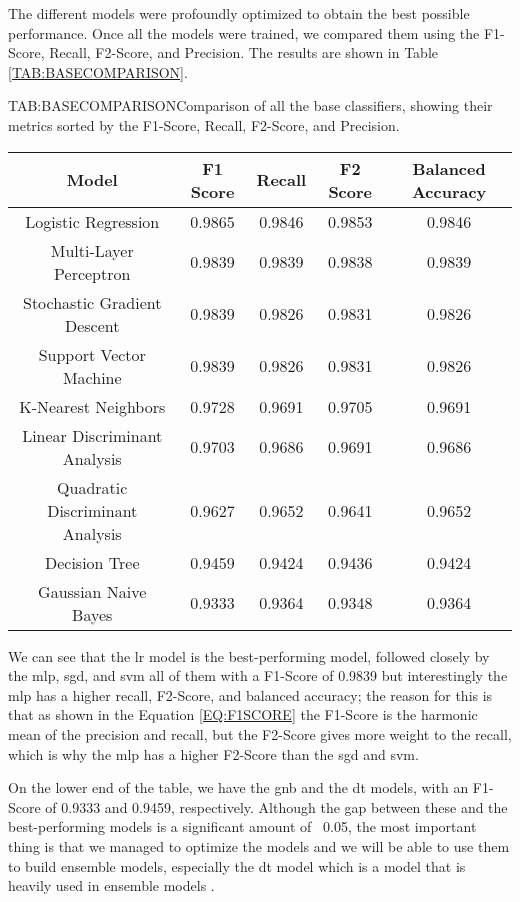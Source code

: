 The different models were profoundly optimized to obtain the best possible performance. Once all the models were trained, we compared them using the F1-Score, Recall, F2-Score, and Precision. The results are shown in Table \ref{TAB:BASECOMPARISON}.

\begin{table}[Base Classifiers Comparison]{TAB:BASECOMPARISON}{Comparison of all the base classifiers, showing their metrics sorted by the F1-Score, Recall, F2-Score, and Precision.}
    \begin{tabular}{|c|c|c|c|c|}
        \hline
        \textbf{Model} & \textbf{F1 Score} & \textbf{Recall} & \textbf{F2 Score} & \textbf{Balanced Accuracy} \\
        \hline
        Logistic Regression           & 0.9865 & 0.9846 & 0.9853 & 0.9846 \\
        Multi-Layer Perceptron        & 0.9839 & 0.9839 & 0.9838 & 0.9839 \\
        Stochastic Gradient Descent   & 0.9839 & 0.9826 & 0.9831 & 0.9826 \\
        Support Vector Machine        & 0.9839 & 0.9826 & 0.9831 & 0.9826 \\
        K-Nearest Neighbors           & 0.9728 & 0.9691 & 0.9705 & 0.9691 \\
        Linear Discriminant Analysis  & 0.9703 & 0.9686 & 0.9691 & 0.9686 \\
        Quadratic Discriminant Analysis & 0.9627 & 0.9652 & 0.9641 & 0.9652 \\
        Decision Tree                 & 0.9459 & 0.9424 & 0.9436 & 0.9424 \\
        Gaussian Naive Bayes          & 0.9333 & 0.9364 & 0.9348 & 0.9364 \\
        \hline
    \end{tabular}
\end{table}

We can see that the \acl{lr} model is the best-performing model, followed closely by the \acl{mlp}, \acl{sgd}, and \acl{svm} all of them with a F1-Score of 0.9839 but interestingly the \ac{mlp} has a higher recall, F2-Score, and balanced accuracy; the reason for this is that as shown in the Equation \ref{EQ:F1SCORE} the F1-Score is the harmonic mean of the precision and recall, but the F2-Score gives more weight to the recall, which is why the \ac{mlp} has a higher F2-Score than the \ac{sgd} and \ac{svm}.

On the lower end of the table, we have the \ac{gnb} and the \ac{dt} models, with an F1-Score of 0.9333 and 0.9459, respectively. Although the gap between these and the best-performing models is a significant amount of ~0.05, the most important thing is that we managed to optimize the models and we will be able to use them to build ensemble models, especially the \ac{dt} model which is a model that is heavily used in ensemble models \cite{banfield_comparison_2007}.